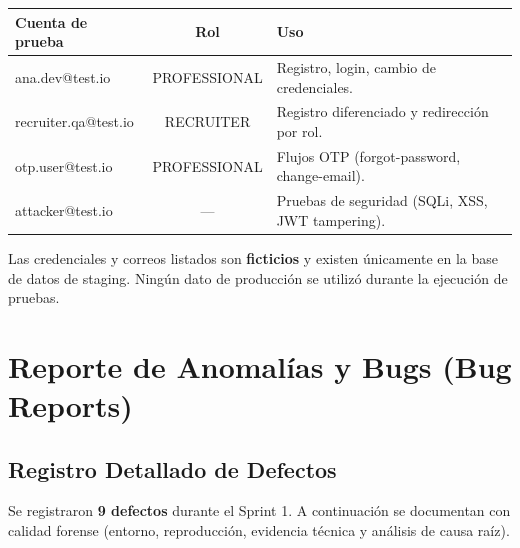 \vspace{0.2cm}
\noindent
\renewcommand{\arraystretch}{1.3}
\fontsize{8.5}{10.2}\selectfont\sffamily
\begin{tabularx}{\textwidth}{|>{\ttfamily}p{4.6cm}|c|Y|}
\hline
{}
\sffamily\textbf{Cuenta de prueba} & \sffamily\textbf{Rol} & \sffamily\textbf{Uso} \\
\hline
ana.dev@test.io & PROFESSIONAL & Registro, login, cambio de credenciales. \\ \hline
{}
recruiter.qa@test.io & RECRUITER & Registro diferenciado y redirección por rol. \\ \hline
otp.user@test.io & PROFESSIONAL & Flujos OTP (forgot-password, change-email). \\ \hline
{}
attacker@test.io & — & Pruebas de seguridad (SQLi, XSS, JWT tampering). \\ \hline
\end{tabularx}

\begin{NotaTecnica}
Las credenciales y correos listados son \textbf{ficticios} y existen únicamente en la base
de datos de staging. Ningún dato de producción se utilizó durante la ejecución de pruebas.
\end{NotaTecnica}

\clearpage
\section{Reporte de Anomalías y Bugs (Bug Reports)}
\label{sec:s1-bugs}

\subsection{Registro Detallado de Defectos}
\label{sec:s1-registro}

Se registraron \textbf{9 defectos} durante el Sprint 1. A continuación se documentan con
calidad forense (entorno, reproducción, evidencia técnica y análisis de causa raíz).

